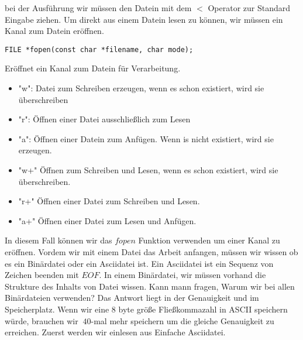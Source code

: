 \documentclass{article}[12pt]
\newenvironment{myexampleblock}[1]{%
    \tcolorbox[beamer,%
    noparskip,breakable,
    colback=White,colframe=ForestGreen,%
    colbacklower=LimeGreen!75!White,%
    title=#1]}%
    {\endtcolorbox}
\begin{document}
bei der Ausführung wir müssen den Datein mit dem $<$ Operator zur Standard Eingabe ziehen. Um direkt aus
einem Datein lesen zu können, wir müssen ein Kanal zum Datein eröffnen.
\begin{myexampleblock}{Funktion: \texttt{fopen}}
\begin{lstlisting}
FILE *fopen(const char *filename, char mode);
\end{lstlisting}
\vspace{-0.4cm}
Eröffnet ein Kanal zum Datein für Verarbeitung.
\begin{itemize} 
\itemsep0.5ex
\item "w": Datei zum Schreiben erzeugen, wenn es schon existiert, wird sie überschreiben
\item "r": Öffnen einer Datei ausschließlich zum Lesen
\item "{}a": Öffnen einer Datein zum Anfügen. Wenn is nicht existiert, wird sie erzeugen.
\item "w+" Öffnen zum Schreiben und Lesen, wenn es schon existiert, wird sie überschreiben.
\item "r+" Öffnen einer Datei zum Schreiben und Lesen.
\item "{}a+" Öffnen einer Datei zum Lesen und Anfügen.
\end{itemize}
\end{myexampleblock}  
In diesem Fall können wir das $fopen$ Funktion verwenden um einer Kanal zu eröffnen. Vordem
wir mit einem Datei das Arbeit anfangen, müssen wir wissen ob es ein Binärdatei oder ein Asciidatei
ist. Ein Asciidatei ist ein Sequenz von Zeichen beenden mit $EOF$. In einem Binärdatei, wir müssen vorhand
die Strukture des Inhalts von Datei wissen. Kann mann fragen, Warum wir bei allen Binärdateien verwenden?
Das Antwort liegt in der Genauigkeit und im Speicherplatz. Wenn wir eine 8 byte größe Fließkommazahl in 
ASCII speichern würde, brauchen wir $~40$-mal mehr speichern um die gleiche Genauigkeit zu erreichen. Zuerst 
werden wir einlesen aus Einfache Asciidatei.
\end{document}
